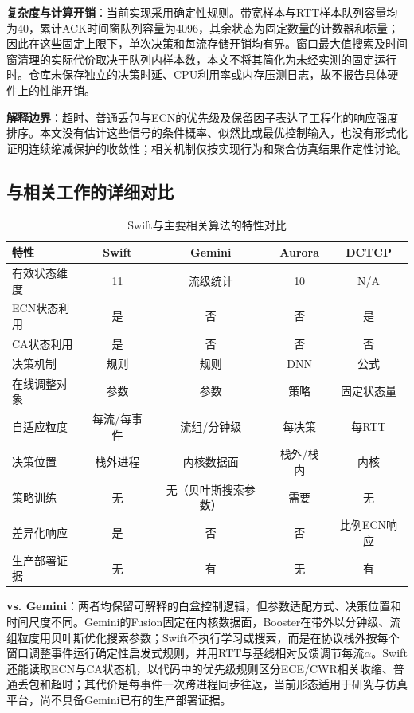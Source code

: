 \documentclass[10pt,twocolumn]{article}
\begin{document}
\textbf{复杂度与计算开销}：当前实现采用确定性规则。带宽样本与RTT样本队列容量均为40，累计ACK时间窗队列容量为4096，其余状态为固定数量的计数器和标量；因此在这些固定上限下，单次决策和每流存储开销均有界。窗口最大值搜索及时间窗清理的实际代价取决于队列内样本数，本文不将其简化为未经实测的固定运行时。仓库未保存独立的决策时延、CPU利用率或内存压测日志，故不报告具体硬件上的性能开销。

\textbf{解释边界}：超时、普通丢包与ECN的优先级及保留因子表达了工程化的响应强度排序。本文没有估计这些信号的条件概率、似然比或最优控制输入，也没有形式化证明连续缩减保护的收敛性；相关机制仅按实现行为和聚合仿真结果作定性讨论。

\subsection{与相关工作的详细对比}

\begin{table}[htbp]
\centering
\caption{Swift与主要相关算法的特性对比}
\label{tab:comparison}
\footnotesize
\setlength{\tabcolsep}{2.5pt}
\begin{tabular}{@{}lcccc@{}}
\toprule
\textbf{特性} & \textbf{Swift} & \textbf{Gemini} & \textbf{Aurora} & \textbf{DCTCP} \\
\midrule
有效状态维度 & 11 & 流级统计 & 10 & N/A \\
ECN状态利用 & 是 & 否 & 否 & 是 \\
CA状态利用 & 是 & 否 & 否 & 否 \\
决策机制 & 规则 & 规则 & DNN & 公式 \\
在线调整对象 & 参数 & 参数 & 策略 & 固定状态量 \\
自适应粒度 & 每流/每事件 & 流组/分钟级 & 每决策 & 每RTT \\
决策位置 & 栈外进程 & 内核数据面 & 栈外/栈内 & 内核 \\
策略训练 & 无 & 无（贝叶斯搜索参数） & 需要 & 无 \\
差异化响应 & 是 & 否 & 否 & 比例ECN响应 \\
生产部署证据 & 无 & 有 & 无 & 有 \\
\bottomrule
\end{tabular}
\end{table}

\textbf{vs. Gemini\cite{gemini}}：两者均保留可解释的白盒控制逻辑，但参数适配方式、决策位置和时间尺度不同。Gemini的Fusion固定在内核数据面，Booster在带外以分钟级、流组粒度用贝叶斯优化搜索参数；Swift不执行学习或搜索，而是在协议栈外按每个窗口调整事件运行确定性启发式规则，并用RTT与基线相对反馈调节每流$\alpha$。Swift还能读取ECN与CA状态机，以代码中的优先级规则区分ECE/CWR相关收缩、普通丢包和超时；其代价是每事件一次跨进程同步往返，当前形态适用于研究与仿真平台，尚不具备Gemini已有的生产部署证据。
\end{document}
